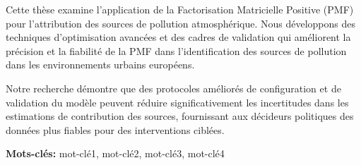 \noindent Cette thèse examine l'application de la Factorisation Matricielle Positive (PMF) pour l'attribution des sources de pollution atmosphérique. Nous développons des techniques d'optimisation avancées et des cadres de validation qui améliorent la précision et la fiabilité de la PMF dans l'identification des sources de pollution dans les environnements urbains européens.

Notre recherche démontre que des protocoles améliorés de configuration et de validation du modèle peuvent réduire significativement les incertitudes dans les estimations de contribution des sources, fournissant aux décideurs politiques des données plus fiables pour des interventions ciblées.

\vspace{0.5cm}

\noindent \textbf{Mots-clés:} mot-clé1, mot-clé2, mot-clé3, mot-clé4
